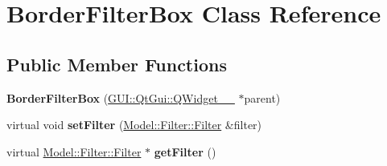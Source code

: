 \hypertarget{classGUI_1_1BorderFilterBox}{}\section{Border\+Filter\+Box Class Reference}
\label{classGUI_1_1BorderFilterBox}
\subsection*{Public Member Functions}
\begin{DoxyCompactItemize}
\item 
\hypertarget{classGUI_1_1BorderFilterBox_ae0dc59600e5b00579305ae59c3764c2d}{}{\bfseries Border\+Filter\+Box} (\hyperlink{classGUI_1_1QtGui_1_1QWidget____10}{G\+U\+I\+::\+Qt\+Gui\+::\+Q\+Widget\+\_\+\+\_} $\ast$parent)\label{classGUI_1_1BorderFilterBox_ae0dc59600e5b00579305ae59c3764c2d}

\item 
\hypertarget{classGUI_1_1BorderFilterBox_ad7c0ee00fe3faac7942d75eec2a5342b}{}virtual void {\bfseries set\+Filter} (\hyperlink{classModel_1_1Filter_1_1Filter}{Model\+::\+Filter\+::\+Filter} \&filter)\label{classGUI_1_1BorderFilterBox_ad7c0ee00fe3faac7942d75eec2a5342b}

\item 
\hypertarget{classGUI_1_1BorderFilterBox_acef2029a93f4ab3a538cdb643b9c2613}{}virtual \hyperlink{classModel_1_1Filter_1_1Filter}{Model\+::\+Filter\+::\+Filter} $\ast$ {\bfseries get\+Filter} ()\label{classGUI_1_1BorderFilterBox_acef2029a93f4ab3a538cdb643b9c2613}

\end{DoxyCompactItemize}
